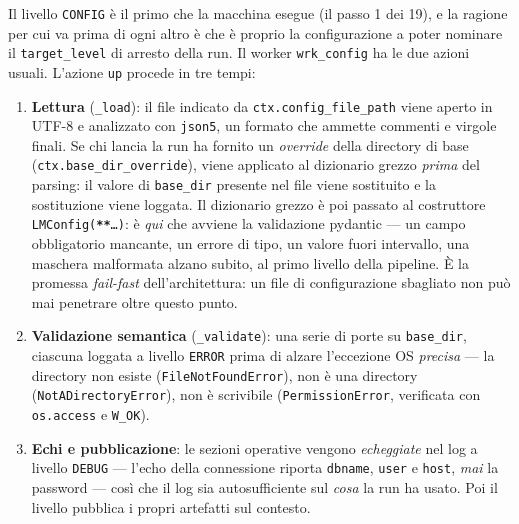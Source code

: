 Il livello \texttt{CONFIG} è il primo che la macchina esegue (il passo 1 dei
19), e la ragione per cui va prima di ogni altro è che è proprio la
configurazione a poter nominare il \texttt{target\_level} di arresto della
run. Il worker \texttt{wrk\_config} ha le due azioni usuali. L'azione
\texttt{up} procede in tre tempi:

\begin{enumerate}[leftmargin=*]
  \item \textbf{Lettura} (\texttt{\_load}): il file indicato da
        \texttt{ctx.config\_file\_path} viene aperto in UTF-8 e analizzato
        con \texttt{json5}, un formato che ammette commenti e virgole finali.
        Se chi lancia la run ha fornito un \emph{override} della directory di
        base (\texttt{ctx.base\_dir\_override}), viene applicato al dizionario
        grezzo \emph{prima} del parsing: il valore di \texttt{base\_dir}
        presente nel file viene sostituito e la sostituzione viene loggata.
        Il dizionario grezzo è poi passato al costruttore
        \texttt{LMConfig(\textbf{**}\ldots)}: è \emph{qui} che avviene la
        validazione pydantic — un campo obbligatorio mancante, un errore di
        tipo, un valore fuori intervallo, una maschera malformata alzano
        subito, al primo livello della pipeline. È la promessa
        \emph{fail-fast} dell'architettura: un file di configurazione
        sbagliato non può mai penetrare oltre questo punto.
  \item \textbf{Validazione semantica} (\texttt{\_validate}): una serie di
        porte su \texttt{base\_dir}, ciascuna loggata a livello
        \texttt{ERROR} prima di alzare l'eccezione OS \emph{precisa} — la
        directory non esiste (\texttt{FileNotFoundError}), non è una
        directory (\texttt{NotADirectoryError}), non è scrivibile
        (\texttt{PermissionError}, verificata con \texttt{os.access} e
        \texttt{W\_OK}).
  \item \textbf{Echi e pubblicazione}: le sezioni operative vengono
        \emph{echeggiate} nel log a livello \texttt{DEBUG} — l'echo della
        connessione riporta \texttt{dbname}, \texttt{user} e \texttt{host},
        \emph{mai} la password — così che il log sia autosufficiente sul
        \emph{cosa} la run ha usato. Poi il livello pubblica i propri
        artefatti sul contesto.
\end{enumerate}

